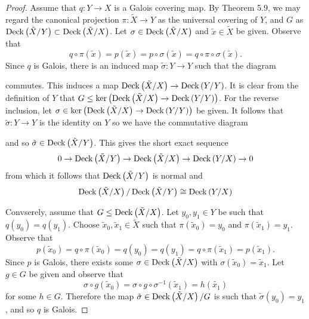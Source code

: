 \documentclass[10pt]{amsart}
\begin{document}
\begin{thm}
  \begin{proof}
    Assume that $q \colon Y \rightarrow X$ is a Galois covering map.
    By Theorem 5.9, we may regard the canonical projection $\pi \colon \tilde{X} \rightarrow Y$ as the universal covering of $Y$, and $G$ as $\operatorname{Deck}\left(\tilde{X}/Y\right) \subset \operatorname{Deck}\left(\tilde{X}/X\right)$.
    Let $\sigma \in \operatorname{Deck}\left(\tilde{X}/X\right)$ and $\tilde{x} \in \tilde{X}$ be given.
    Observe that
    $$q \circ \pi (\tilde{x}) = p(\tilde{x}) = p \circ \sigma(\tilde{x}) = q \circ \pi \circ \sigma(\tilde{x}).$$
    Since $q$ is Galois, there is an induced map $\tilde{\sigma} \colon Y \rightarrow Y$ such that the diagram
    \begin{center}
    \end{center}
    commutes.
    This induces a map $\operatorname{Deck}\left(\tilde{X}/X\right) \rightarrow \operatorname{Deck}\left(Y/Y\right)$.
    It is clear from the definition of $Y$ that $G \leq \ker\left({\operatorname{Deck}\left(\tilde{X}/X\right) \rightarrow \operatorname{Deck}\left(Y/Y\right)}\right)$.
    For the reverse inclusion, let $\sigma \in \ker\left({\operatorname{Deck}\left(\tilde{X}/X\right) \rightarrow \operatorname{Deck}\left(Y/Y\right)}\right)$ be given.
    It follows that $\tilde{\sigma} \colon Y \rightarrow Y$ is the identity on $Y$ so we have the commutative diagram
    \begin{center}
    \end{center}
    and so $\tilde{\sigma} \in \operatorname{Deck}\left(\tilde{X}/Y\right)$.
    This gives the short exact sequence
    $$0 \rightarrow \operatorname{Deck}\left(\tilde{X}/Y\right) \rightarrow \operatorname{Deck}\left(\tilde{X}/X\right) \rightarrow \operatorname{Deck}\left(Y/X\right) \rightarrow 0$$
    from which it follows that $\operatorname{Deck}\left(\tilde{X}/Y\right)$ is normal and 
    $$\operatorname{Deck}\left(\tilde{X}/X\right)/\operatorname{Deck}\left(\tilde{X}/Y\right) \cong \operatorname{Deck}\left(Y/X\right)$$
    
    Convserely, assume that $G \leq \operatorname{Deck}\left(\tilde{X}/X\right)$.
    Let $y_0, y_1 \in Y$ be such that $q(y_0) = q(y_1)$.
    Choose $\tilde{x}_0, \tilde{x}_1 \in \tilde{X}$ such that $\pi(\tilde{x}_0) = y_0$ and $\pi(\tilde{x}_1) = y_1.$
    Observe that
    $$p(\tilde{x}_0) = q \circ \pi (\tilde{x}_0) = q(y_0) = q(y_1) = q \circ \pi(\tilde{x}_1) = p(\tilde{x}_1).$$
    Since $p$ is Galois, there exists some $\sigma \in \operatorname{Deck}\left(\tilde{X}/X\right)$ with $\sigma(\tilde{x}_0) = \tilde{x}_1$.
    Let $g \in G$ be given and observe that
    $$\sigma \circ g(\tilde{x}_0) = \sigma \circ g \circ \sigma^{-1}(\tilde{x}_1) = h (\tilde{x_1})$$
    for some $h \in G$.
    Therefore the map $\tilde{\sigma} \in \operatorname{Deck}\left(\tilde{X}/X\right)/G$ is such that $\tilde{\sigma}(y_0) = y_1$, and so $q$ is Galois.
  \end{proof}
  
\end{thm}
\end{document}
